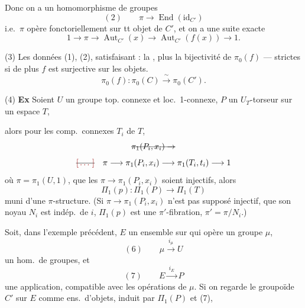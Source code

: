 \documentclass[11pt,a4paper]{article}
\begin{document}
Donc on a un homomorphisme de groupes
\[
  (2) \qquad \pi \longrightarrow \operatorname{End}(\mathrm{id}_{C'})
\]
i.e.\ $\pi$ opère fonctoriellement sur tt objet de $C'$, et on a une suite exacte
\[
  1 \longrightarrow \pi \longrightarrow \operatorname{Aut}_{C'}(x) \longrightarrow
  \operatorname{Aut}_{C'}(f(x)) \longrightarrow 1 .
\]

(3) Les données (1), (2), satisfaisant : la  \ill{}
, \ill{} plus la bijectivité de
$\pi_0(f)$ \ill{} — \ill{} strictes si de plus $f$ est surjective sur les objets.
\[
  \pi_0(f) : \pi_0(C) \xrightarrow{\;\sim\;} \pi_0(C') .
\]

(4) \textbf{Ex} Soient $U$ un groupe top. \struck{\ill{}} connexe et loc.\ 1-connexe, $P$ un
$U_T$-torseur sur un espace $T$,


alors pour les comp.\ connexes $T_i$ de $T$,
\[
  \text{\struck{$\pi_1(P_i, x_i) \to$}}
\]
\[
  \text{\struck{\ill{}}}\quad \pi \longrightarrow \pi_1(P_i, x_i) \longrightarrow \pi_1(T_i, t_i) \longrightarrow 1
\]
où $\pi = \pi_1(U, 1)$,  que les 
$\pi \to \pi_1(P_i, x_i)$ soient injectifs, alors
\[
  \Pi_1(p) : \Pi_1(P) \longrightarrow \Pi_1(T)
\]
 muni d'une $\pi$-structure. (Si $\pi \to \pi_1(P_i, x_i)$  n'est
pas supposé injectif,  que son noyau $N_i$ est indép.\ de $i$, $\Pi_1(p)$ est
\struck{\ill{}} une $\pi'$-fibration, $\pi' = \pi / N_i$.)

Soit, dans l'exemple précédent, $E$ un ensemble  sur qui opère un
groupe \struck{\ill{}} $\mu$,
\[
  (6) \qquad \mu \xrightarrow{\;i_\mu\;} U
\]
un hom.\ de groupes, et
\[
  (7) \qquad E \xrightarrow{\;i_E\;} P
\]
une application, compatible avec les opérations de $\mu$. Si on regarde le 
groupoïde $C'$ sur $E$ comme ens.\ d'objets, induit par $\Pi_1(P)$ et (7),

\end{document}
